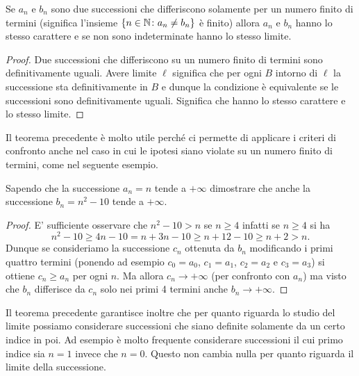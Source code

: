 \begin{theorem}
\mymark{**}%
%
%
%
Se $a_n$ e $b_n$ sono due successioni
che differiscono solamente per un numero finito di termini
(significa l'insieme ${\left\{ n\in \mathbb N\colon a_n \neq b_n \right\}}$ è finito)
allora $a_n$ e $b_n$ hanno lo stesso carattere e se non
sono indeterminate hanno lo stesso limite.
\end{theorem}
%
\begin{proof}
Due successioni che differiscono su un numero finito
di termini sono definitivamente uguali.
Avere limite $\ell$ significa che per ogni $B$ intorno di $\ell$
la successione sta definitivamente in $B$ e dunque la condizione
è equivalente se le successioni sono definitivamente uguali.
Significa che hanno lo stesso carattere e lo stesso limite.
\end{proof}

Il teorema precedente è molto utile perché ci permette di applicare
i criteri di confronto anche nel caso in cui le ipotesi siano violate
su un numero finito di termini, come nel seguente esempio.

\begin{example}
Sapendo che la successione $a_n = n$ tende a $+\infty$ dimostrare
che anche la successione $b_n = n^2-10$ tende a $+\infty$.
\end{example}
%
\begin{proof}
E' sufficiente osservare che $n^2-10 > n$ se $n\ge 4$ infatti
se $n\ge 4$ si ha
\[
n^2 - 10 \ge 4 n -10 = n + 3n - 10 \ge n + 12 -10 \ge n+2 > n.
\]
Dunque se consideriamo la successione $c_n$ ottenuta da $b_n$
modificando i primi quattro termini (ponendo ad esempio $c_0 = a_0$,
$c_1=a_1$, $c_2=a_2$ e $c_3=a_3$) si ottiene $c_n\ge a_n$ per ogni $n$.
Ma allora $c_n \to +\infty$ (per confronto con $a_n$) ma visto che
$b_n$ differisce da $c_n$ solo nei primi 4 termini anche $b_n\to +\infty$.
\end{proof}

Il teorema precedente garantisce inoltre
che per quanto riguarda lo studio del limite possiamo considerare
successioni che siano definite solamente da un certo indice in poi.
Ad esempio è molto frequente considerare successioni il cui primo indice sia
$n=1$ invece che $n=0$. Questo non cambia nulla per quanto riguarda il limite
della successione.

